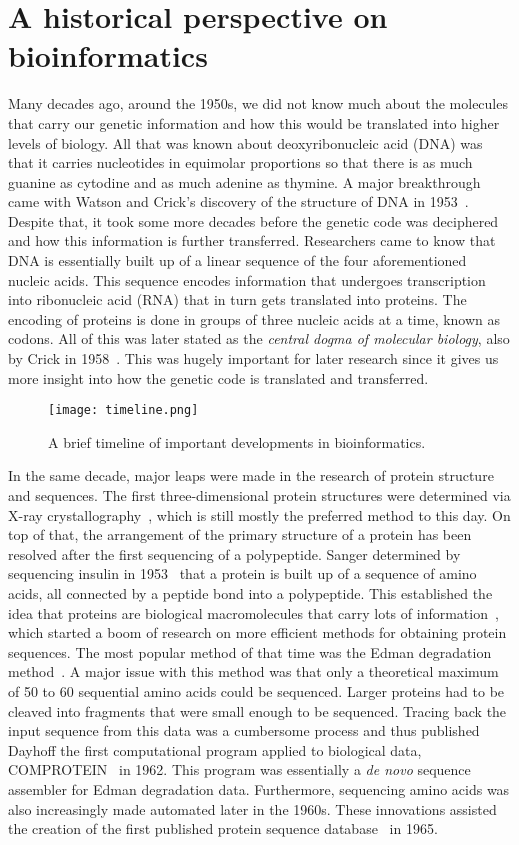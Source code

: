 \section{A historical perspective on bioinformatics}
Many decades ago, around the 1950s, we did not know much about the molecules that carry our genetic information and how this would be translated into higher levels of biology. All that was known about deoxyribonucleic acid (DNA) was that it carries nucleotides in equimolar proportions so that there is as much guanine as cytodine and as much adenine as thymine. A major breakthrough came with Watson and Crick's discovery of the structure of DNA in 1953~\cite{dnastruct}. Despite that, it took some more decades before the genetic code was deciphered and how this information is further transferred. Researchers came to know that DNA is essentially built up of a linear sequence of the four aforementioned nucleic acids. This sequence encodes information that undergoes transcription into ribonucleic acid (RNA) that in turn gets translated into proteins. The encoding of proteins is done in groups of three nucleic acids at a time, known as codons. All of this was later stated as the \textit{central dogma of molecular biology}, also by Crick in 1958~\cite{dogma}. This was hugely important for later research since it gives us more insight into how the genetic code is translated and transferred.
\begin{figure}[h]
    \centering
    \texttt{[image: timeline.png]}
    \caption{A brief timeline of important developments in bioinformatics.}
    \label{fig:timeline}
\end{figure}
In the same decade, major leaps were made in the research of protein structure and sequences. The first three-dimensional protein structures were determined via X-ray crystallography~\cite{xray}, which is still mostly the preferred method to this day. On top of that, the arrangement of the primary structure of a protein has been resolved after the first sequencing of a polypeptide. Sanger determined by sequencing insulin in 1953~\cite{insulin} that a protein is built up of a sequence of amino acids, all connected by a peptide bond into a polypeptide. This established the idea that proteins are biological macromolecules that carry lots of information~\cite{primstruct}, which started a boom of research on more efficient methods for obtaining protein sequences. The most popular method of that time was the Edman degradation method~\cite{edman}. A major issue with this method was that only a theoretical maximum of 50 to 60 sequential amino acids could be sequenced. Larger proteins had to be cleaved into fragments that were small enough to be sequenced. Tracing back the input sequence from this data was a cumbersome process and thus published Dayhoff the first computational program applied to biological data, COMPROTEIN~\cite{comprotein} in 1962. This program was essentially a \textit{de novo} sequence assembler for Edman degradation data. Furthermore, sequencing amino acids was also increasingly made automated later in the 1960s. These innovations assisted the creation of the first published protein sequence database~\cite{atlas} in 1965.

